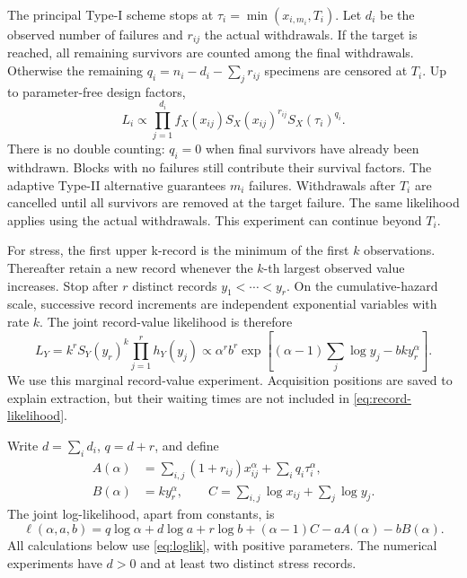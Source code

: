 \documentclass[a4paper,11pt]{article}
\begin{document}
The principal Type-I scheme stops at $\tau_i=\min(x_{i,m_i},T_i)$. Let $d_i$ be the observed number of failures and $r_{ij}$ the actual withdrawals. If the target is reached, all remaining survivors are counted among the final withdrawals. Otherwise the remaining $q_i=n_i-d_i-\sum_jr_{ij}$ specimens are censored at $T_i$. Up to parameter-free design factors,
\begin{equation}
L_i\propto\prod_{j=1}^{d_i}f_X(x_{ij})S_X(x_{ij})^{r_{ij}}S_X(\tau_i)^{q_i}.\label{eq:block-likelihood}
\end{equation}
There is no double counting: $q_i=0$ when final survivors have already been withdrawn. Blocks with no failures still contribute their survival factors. The adaptive Type-II alternative guarantees $m_i$ failures. Withdrawals after $T_i$ are cancelled until all survivors are removed at the target failure. The same likelihood applies using the actual withdrawals. This experiment can continue beyond $T_i$.

For stress, the first upper k-record is the minimum of the first $k$ observations. Thereafter retain a new record whenever the $k$-th largest observed value increases. Stop after $r$ distinct records $y_1<\cdots<y_r$. On the cumulative-hazard scale, successive record increments are independent exponential variables with rate $k$. The joint record-value likelihood is therefore
\begin{equation}
L_Y=k^r S_Y(y_r)^k\prod_{j=1}^r h_Y(y_j)
\propto\alpha^r b^r\exp\left[(\alpha-1)\sum_j\log y_j-bky_r^\alpha\right].\label{eq:record-likelihood}
\end{equation}
We use this marginal record-value experiment. Acquisition positions are saved to explain extraction, but their waiting times are not included in \eqref{eq:record-likelihood}.

Write $d=\sum_i d_i$, $q=d+r$, and define
\begin{align}
A(\alpha)&=\sum_{i,j}(1+r_{ij})x_{ij}^\alpha+\sum_iq_i\tau_i^\alpha,\label{eq:exposure-a}\\
B(\alpha)&=ky_r^\alpha,\qquad C=\sum_{i,j}\log x_{ij}+\sum_j\log y_j.\label{eq:exposure-b}
\end{align}
The joint log-likelihood, apart from constants, is
\begin{equation}
\ell(\alpha,a,b)=q\log\alpha+d\log a+r\log b+(\alpha-1)C-aA(\alpha)-bB(\alpha).\label{eq:loglik}
\end{equation}
All calculations below use \eqref{eq:loglik}, with positive parameters. The numerical experiments have $d>0$ and at least two distinct stress records.
\end{document}

